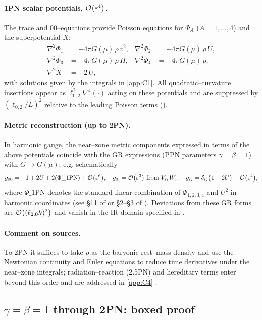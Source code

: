 \documentclass{iopjournal}
\begin{document}
\paragraph{1PN scalar potentials, $\order{\varepsilon^4}$.}
The trace and $00$–equations provide Poisson equations for $\Phi_A$ ($A=1,\dots,4$) and the superpotential $X$:
\begin{align}
\nabla^2 \Phi_1 &= -4\pi G(\mu)\,\rho\,v^2, &
\nabla^2 \Phi_2 &= -4\pi G(\mu)\,\rho\,U, \label{eq:C2_Poisson_Phis}\\
\nabla^2 \Phi_3 &= -4\pi G(\mu)\,\rho\,\Pi, &
\nabla^2 \Phi_4 &= -4\pi G(\mu)\,p, \\
\nabla^2 X &= -2\,U, &&
\end{align}
with solutions given by the integrals in \cref{app:C1}. All quadratic–curvature insertions appear as $\ell_{0,2}^2\nabla^4(\cdot)$ acting on these potentials and are suppressed by $(\ell_{0,2}/L)^2$ relative to the leading Poisson terms ().

\paragraph{Metric reconstruction (up to 2PN).}
In harmonic gauge, the near–zone metric components expressed in terms of the above potentials coincide with the GR expressions (PPN parameters $\gamma=\beta=1$) with $G\to G(\mu)$; e.g. schematically
\[
g_{00}=-1+2U+2(\Phi\_\mathrm{1PN})+\order{\varepsilon^6},\quad
g_{0i}=\order{\varepsilon^3}\ \text{from }V_i,W_i,\quad
g_{ij}=\delta_{ij}\big(1+2U\big)+\order{\varepsilon^4},
\]
where $\Phi\_\mathrm{1PN}$ denotes the standard linear combination of $\Phi_{1,2,3,4}$ and $U^2$ in harmonic coordinates (see \S11 of \cite{PoissonWill2014} or \S2–\S3 of \cite{Blanchet2014LRR}). Deviations from these GR forms are $\order{(\ell_{2,0}k)^2}$ and vanish in the IR domain specified in .

\paragraph{Comment on sources.}
To 2PN it suffices to take $\rho$ as the baryonic rest–mass density and use the Newtonian continuity and Euler equations to reduce time derivatives under the near–zone integrals; radiation–reaction (2.5PN) and hereditary terms enter beyond this order and are addressed in \cref{app:C4} \cite{Blanchet2014LRR}.

\subsection{\texorpdfstring{$\gamma=\beta=1$ through 2PN: boxed proof}{γ=β=1 through 2PN: boxed proof}}\label{app:C3}
\end{document}
